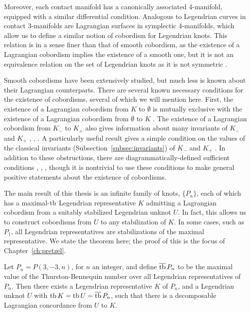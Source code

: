 Moreover, each contact manifold has a canonically associated 4-manifold, equipped with a similar differential condition. Analogous to Legendrian curves in contact 3-manifolds are Lagrangian surfaces in symplectic 4-manifolds, which allow us to define a similar notion of cobordism for Legendrian knots.
This relation is in a sense finer than that of smooth cobordism, as the existence of a Lagrangian cobordism implies the existence of a smooth one, but it is not an equivalence relation on the set of Legendrian knots as it is not symmetric \cite{chantraine2015}.

Smooth cobordisms have been extensively studied, but much less is known about their Lagrangian counterparts. There are several known necessary conditions for the existence of cobordisms, several of which we will mention here.
First, the existence of a Lagrangian cobordism from $K$ to $\emptyset$ is mutually exclusive with the existence of a Lagrangian cobordism from $\emptyset$ to $K$ \cite{gromov}.
The existence of a Lagrangian cobordism from $K_-$ to $K_+$ also gives information about many invariants of $K_-$ and $K_+$ \cite{pan}, \cite{cdrg}, \cite{baldwin}. 
A particularly useful result gives a simple condition on the values of the classical invariants (Subsection~\ref{subsec:invariants}) of $K_-$ and $K_+$ \cite{chantraine2010}.
In addition to these obstructions, there are diagrammatically-defined sufficient conditions \cite{bourgeois15}, \cite{lin}, \cite{guadagni}, though it is nontrivial to use these conditions to make general positive statements about the existence of cobordisms.

The main result of this thesis is an infinite family of knots, $\{P_n\}$, each of which has a maximal-$\operatorname{tb}$ Legendrian representative $K$ admitting a Lagrangian cobordism from a suitably stabilized Legendrian unknot $U$. In fact, this allows us to construct cobordisms from $U$ to any stabilization of $K$. In some cases, such as $P_1$, all Legendrian representatives are stabilizations of the maximal representative.
We state the theorem here; the proof of this is the focus of Chapter~\ref{ch:pretzel}.

\begin{mythmcopy}
     Let $P_n = P(3, -3, n)$, for $n$ an integer, and define $\overline{\operatorname{tb}}\, P_n$ to be the maximal value of the Thurston-Bennequin number over all Legendrian representatives of $P_n$. Then there exists a Legendrian representative $K$ of $P_n$, and a Legendrian unknot $U$ with $\operatorname{tb} K = \operatorname{tb} U = \overline{\operatorname{tb}}\, P_n$, such that there is a decomposable Lagrangian concordance from $U$ to $K$.
\end{mythmcopy}



